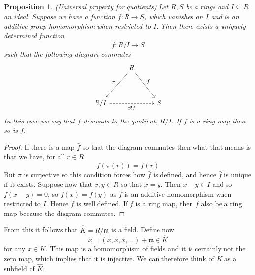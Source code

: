 \documentclass{article}
\newtheorem{proposition}{Proposition}[section]
\newcommand{\mfrak}[1]{\mathfrak{#1}}
\begin{document}
\begin{proposition}(Universal property for quotients) \label{prop: Universal property for quotients}
    Let $R,S$ be a rings and $I \subseteq R$ an ideal. Suppose we have a function $f : R \to S$, which vanishes on $I$ and is an additive group homomorphism when restricted to $I$. Then there exists a uniquely determined function $$\bar f : R / I \to S$$
    such that the following diagram commutes
\[\begin{tikzcd}
	& R \\
	\\
	{R/I} && S
	\arrow["{\exists! \bar f}"', dashed, from=3-1, to=3-3]
	\arrow["\pi"', from=1-2, to=3-1]
	\arrow["f", from=1-2, to=3-3]
\end{tikzcd}\]
    In this case we say that $f$ descends to the quotient, $R / I$. If $f$ is a ring map then so is $\bar f$.  
\end{proposition}
\begin{proof}
    If there is a map $\bar f$ so that the diagram commutes then what that means is that we have, for all $r \in R$ 
    $$\bar f (\pi(r)) = f(r)$$
    But $\pi$ is surjective so this condition forces how $\bar f$ is defined, and hence $\bar f$ is unique if it exists. Suppose now that $x,y \in R$ so that $\bar x = \bar y$. Then $x-y \in I$ and so $f(x-y) = 0$, so $f(x) = f(y)$ as $f$ is an additive homomorphism when restricted to $I$. Hence $\bar f$ is well defined. If $f$ is a ring map, then $\bar f$ also be a ring map because the diagram commutes. 
\end{proof}


From this it follows that $\hat K = R / \mfrak m$ is a field. Define now $$\tilde x = (x,x,x,...) + \mfrak m \in \hat K$$ for any $x \in K$. This map is a homomorphism of fields and it is certainly not the zero map, which implies that it is injective. We can therefore think of $K$ as a subfield of $\hat K$. 
\end{document}
